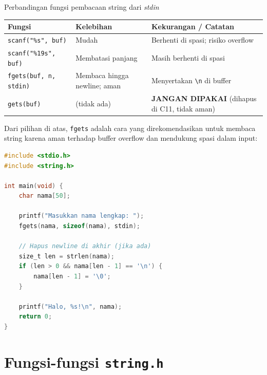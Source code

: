 \documentclass[../main.tex]{subfiles}
\begin{document}
\begin{modultable}[]{Perbandingan fungsi pembacaan string dari \textit{stdin}}
{\small
\begin{tabularx}{\textwidth}{@{}|>{\raggedright\arraybackslash}p{3.2cm}|>{\raggedright\arraybackslash}p{4.9cm}|>{\raggedright\arraybackslash}X|@{}}
\hline
\textbf{Fungsi} & \textbf{Kelebihan} & \textbf{Kekurangan / Catatan} \\
\hline
\texttt{scanf("\%s", buf)} & Mudah & Berhenti di spasi; risiko overflow \\
\hline
\texttt{scanf("\%19s", buf)} & Membatasi panjang & Masih berhenti di spasi \\
\hline
\texttt{fgets(buf, n, stdin)} & Membaca hingga newline; aman & Menyertakan \texttt{\textbackslash n} di buffer \\
\hline
\texttt{gets(buf)} & (tidak ada) & \textbf{JANGAN DIPAKAI} (dihapus di C11, tidak aman) \\
\end{tabularx}
\par
}
\end{modultable}

Dari pilihan di atas, \texttt{fgets} adalah cara yang direkomendasikan untuk membaca string karena aman terhadap buffer overflow dan mendukung spasi dalam input:

\begin{lstlisting}[language=C,caption=Input string aman dengan \texttt{fgets}]
#include <stdio.h>
#include <string.h>

int main(void) {
    char nama[50];
    
    printf("Masukkan nama lengkap: ");
    fgets(nama, sizeof(nama), stdin);
    
    // Hapus newline di akhir (jika ada)
    size_t len = strlen(nama);
    if (len > 0 && nama[len - 1] == '\n') {
        nama[len - 1] = '\0';
    }
    
    printf("Halo, %s!\n", nama);
    return 0;
}
\end{lstlisting}

\section{Fungsi-fungsi \texttt{string.h}}
\end{document}

